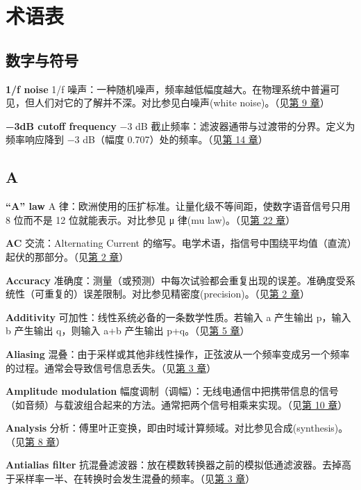 
\chapter{术语表}\label{ch-34}

\section{数字与符号}

\textbf{1/f noise} 1/f
噪声：一种随机噪声，频率越低幅度越大。在物理系统中普遍可见，但人们对它的了解并不深。对比参见白噪声(white
noise)。（见\hyperref[ch-09]{第 9 章}）

\textbf{−3dB cutoff frequency} −3 dB
截止频率：滤波器通带与过渡带的分界。定义为频率响应降到 −3 dB（幅度
0.707）处的频率。（见\hyperref[ch-14]{第 14 章}）

\section{A}

\textbf{``A'' law} A
律：欧洲使用的压扩标准。让量化级不等间距，使数字语音信号只用 8 位而不是
12 位就能表示。对比参见 μ 律(mu law)。（见\hyperref[ch-22]{第 22 章}）

\textbf{AC} 交流：Alternating Current
的缩写。电学术语，指信号中围绕平均值（直流）起伏的那部分。（见\hyperref[ch-02]{第
2 章}）

\textbf{Accuracy}
准确度：测量（或预测）中每次试验都会重复出现的误差。准确度受系统性（可重复的）误差限制。对比参见精密度(precision)。（见\hyperref[ch-02]{第
2 章}）

\textbf{Additivity} 可加性：线性系统必备的一条数学性质。若输入 a
产生输出 p，输入 b 产生输出 q，则输入 a+b 产生输出
p+q。（见\hyperref[ch-05]{第 5 章}）

\textbf{Aliasing}
混叠：由于采样或其他非线性操作，正弦波从一个频率变成另一个频率的过程。通常会导致信号信息丢失。（见\hyperref[ch-03]{第
3 章}）

\textbf{Amplitude modulation}
幅度调制（调幅）：无线电通信中把携带信息的信号（如音频）与载波组合起来的方法。通常把两个信号相乘来实现。（见\hyperref[ch-10]{第
10 章}）

\textbf{Analysis}
分析：傅里叶正变换，即由时域计算频域。对比参见合成(synthesis)。（见\hyperref[ch-08]{第
8 章}）

\textbf{Antialias filter}
抗混叠滤波器：放在模数转换器之前的模拟低通滤波器。去掉高于采样率一半、在转换时会发生混叠的频率。（见\hyperref[ch-03]{第
3 章}）

